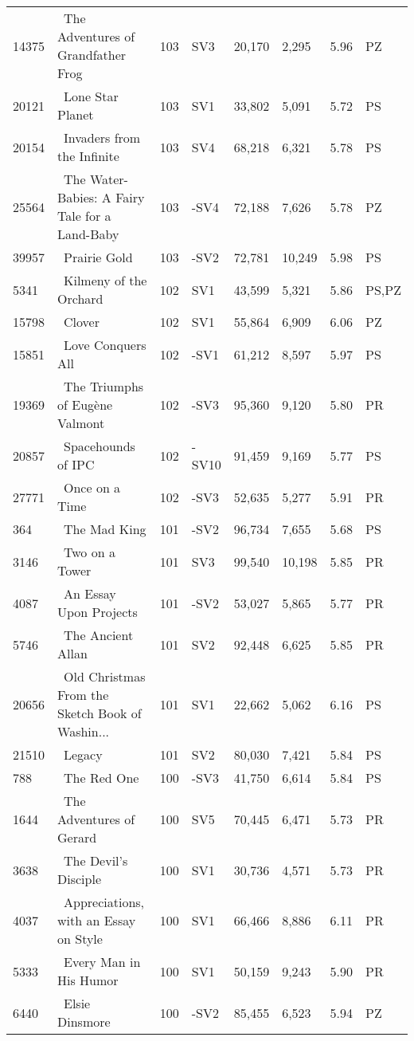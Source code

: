 \begin{longtable}{l | l | l | l | l | l | l | l}
14375 & ~The Adventures of Grandfather Frog & 103 & SV3 & 20,170 & 2,295 & 5.96 & PZ\\
20121 & ~Lone Star Planet & 103 & SV1 & 33,802 & 5,091 & 5.72 & PS\\
20154 & ~Invaders from the Infinite & 103 & SV4 & 68,218 & 6,321 & 5.78 & PS\\
25564 & ~The Water-Babies: A Fairy Tale for a Land-Baby & 103 & -SV4 & 72,188 & 7,626 & 5.78 & PZ\\
39957 & ~Prairie Gold & 103 & -SV2 & 72,781 & 10,249 & 5.98 & PS\\
5341 & ~Kilmeny of the Orchard & 102 & SV1 & 43,599 & 5,321 & 5.86 & PS,PZ\\
15798 & ~Clover & 102 & SV1 & 55,864 & 6,909 & 6.06 & PZ\\
15851 & ~Love Conquers All & 102 & -SV1 & 61,212 & 8,597 & 5.97 & PS\\
19369 & ~The Triumphs of Eugène Valmont & 102 & -SV3 & 95,360 & 9,120 & 5.80 & PR\\
20857 & ~Spacehounds of IPC & 102 & -SV10 & 91,459 & 9,169 & 5.77 & PS\\
27771 & ~Once on a Time & 102 & -SV3 & 52,635 & 5,277 & 5.91 & PR\\
364 & ~The Mad King & 101 & -SV2 & 96,734 & 7,655 & 5.68 & PS\\
3146 & ~Two on a Tower & 101 & SV3 & 99,540 & 10,198 & 5.85 & PR\\
4087 & ~An Essay Upon Projects & 101 & -SV2 & 53,027 & 5,865 & 5.77 & PR\\
5746 & ~The Ancient Allan & 101 & SV2 & 92,448 & 6,625 & 5.85 & PR\\
20656 & ~Old Christmas From the Sketch Book of Washin... & 101 & SV1 & 22,662 & 5,062 & 6.16 & PS\\
21510 & ~Legacy & 101 & SV2 & 80,030 & 7,421 & 5.84 & PS\\
788 & ~The Red One & 100 & -SV3 & 41,750 & 6,614 & 5.84 & PS\\
1644 & ~The Adventures of Gerard & 100 & SV5 & 70,445 & 6,471 & 5.73 & PR\\
3638 & ~The Devil's Disciple & 100 & SV1 & 30,736 & 4,571 & 5.73 & PR\\
4037 & ~Appreciations, with an Essay on Style & 100 & SV1 & 66,466 & 8,886 & 6.11 & PR\\
5333 & ~Every Man in His Humor & 100 & SV1 & 50,159 & 9,243 & 5.90 & PR\\
6440 & ~Elsie Dinsmore & 100 & -SV2 & 85,455 & 6,523 & 5.94 & PZ\\

\end{longtable}
